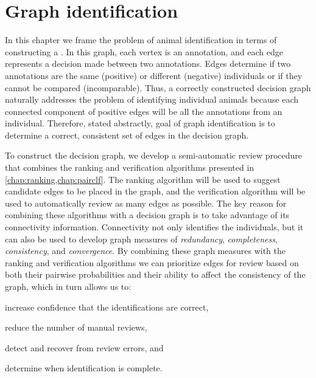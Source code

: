 \chapter{Graph identification}\label{chap:graphid}
\newcommand{\nT}{N}

In this chapter we frame the problem of animal identification in terms of constructing a %
.
In this graph, each vertex is an annotation, and each edge represents a decision made between two annotations.
Edges determine if two annotations are the same (positive) or different (negative) individuals or if they cannot
  be compared (incomparable).
Thus, a correctly constructed decision graph naturally addresses the problem of identifying individual animals
  because each connected component of positive edges will be all the annotations from an individual.
Therefore, stated abstractly, goal of graph identification is to determine a correct, consistent set of edges in
  the decision graph.

To construct the decision graph, we develop a semi-automatic review procedure that combines the ranking and
verification algorithms presented in \cref{chap:ranking,chap:pairclf}. The ranking algorithm will be used to
suggest candidate edges to be placed in the graph, and the verification algorithm will be used to automatically
review as many edges as possible. The key reason for combining these algorithms with a decision graph is to take
advantage of its connectivity information. Connectivity not only identifies the individuals, but it can also be
used to develop graph measures of \emph{redundancy}, \emph{completeness}, \emph{consistency}, and
\emph{convergence}. By combining these graph measures with the ranking and verification algorithms we can
prioritize edges for review based on both their pairwise probabilities and their ability to affect the consistency
of the graph, which in turn allows us to:
\begin{enumin}
\item increase confidence that the identifications are correct, %
\item reduce the number of manual reviews,  %
\item detect and recover from review errors, and %
\item determine when identification is complete. %
\end{enumin}


